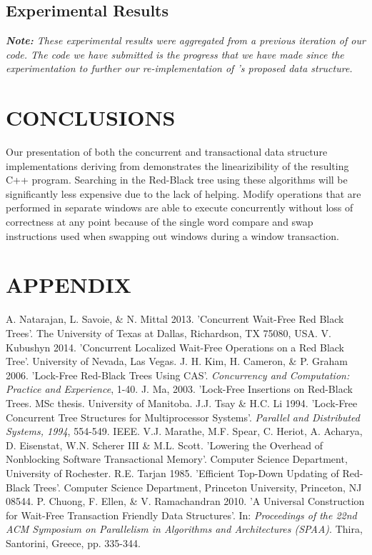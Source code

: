 \documentclass[letterpaper, 10 pt, conference]{ieeeconf}
\begin{document}
\subsection{Experimental Results}
\textit{\textbf{Note:} These experimental results were aggregated from a previous iteration of our code. The code we have submitted is the progress that we have made since the experimentation to further our re-implementation of \cite{c1}'s proposed data structure.}

	\section{CONCLUSIONS}
	Our presentation of both the concurrent and transactional data structure implementations deriving from \cite{c1} demonstrates the linearizibility of the resulting C++ program. Searching in the Red-Black tree using these algorithms will be significantly less expensive due to the lack of helping. Modify operations that are performed in separate windows are able to execute concurrently without loss of correctness at any point because of the single word compare and swap instructions used when swapping out windows during a window transaction.

	\section*{APPENDIX}
	
	\begin{thebibliography}{99}
		
		 A. Natarajan, L. Savoie, \& N. Mittal 2013. 'Concurrent Wait-Free Red Black Trees'. The University of Texas at Dallas, Richardson, TX 75080, USA.
		 V. Kubushyn 2014. 'Concurrent Localized Wait-Free Operations on a Red Black Tree'. University of Nevada, Las Vegas.
		 J. H. Kim, H. Cameron, \& P. Graham 2006. 'Lock-Free Red-Black Trees Using CAS'. \textit{Concurrency and Computation: Practice and Experience}, 1-40.
		 J. Ma, 2003. 'Lock-Free Insertions on Red-Black Trees. MSc thesis. University of Manitoba.
		 J.J. Tsay \& H.C. Li 1994. 'Lock-Free Concurrent Tree Structures for Multiprocessor Systems'. \textit{Parallel and Distributed Systems, 1994}, 554-549. IEEE.
		 V.J. Marathe, M.F. Spear, C. Heriot, A. Acharya, D. Eisenstat, W.N. Scherer III \& M.L. Scott. 'Lowering the Overhead of Nonblocking Software Transactional Memory'. Computer Science Department, University of Rochester.
		 R.E. Tarjan 1985. 'Efficient Top-Down Updating of Red-Black Trees'. Computer Science Department, Princeton University, Princeton, NJ 08544. 
		 P. Chuong, F. Ellen, \& V. Ramachandran 2010. 'A Universal Construction for Wait-Free Transaction Friendly Data Structures'. In: \textit{Proceedings of the 22nd ACM Symposium on Parallelism in Algorithms and Architectures (SPAA)}. Thira, Santorini, Greece, pp. 335-344.
				
	\end{thebibliography}
	
	
	
	
\end{document}
